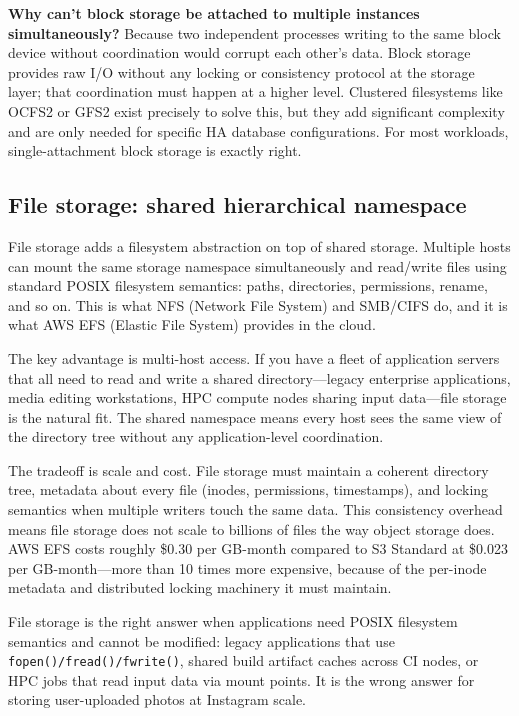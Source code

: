 \documentclass[11pt,a4paper]{article}
\begin{document}
\begin{thinkbox}
\textbf{Why can't block storage be attached to multiple instances simultaneously?} Because two independent processes writing to the same block device without coordination would corrupt each other's data. Block storage provides raw I/O without any locking or consistency protocol at the storage layer; that coordination must happen at a higher level. Clustered filesystems like OCFS2 or GFS2 exist precisely to solve this, but they add significant complexity and are only needed for specific HA database configurations. For most workloads, single-attachment block storage is exactly right.
\end{thinkbox}

\subsection{File storage: shared hierarchical namespace}

File storage adds a filesystem abstraction on top of shared storage. Multiple hosts can mount the same storage namespace simultaneously and read/write files using standard POSIX filesystem semantics: paths, directories, permissions, rename, and so on. This is what NFS (Network File System) and SMB/CIFS do, and it is what AWS EFS (Elastic File System) provides in the cloud.

The key advantage is multi-host access. If you have a fleet of application servers that all need to read and write a shared directory---legacy enterprise applications, media editing workstations, HPC compute nodes sharing input data---file storage is the natural fit. The shared namespace means every host sees the same view of the directory tree without any application-level coordination.

The tradeoff is scale and cost. File storage must maintain a coherent directory tree, metadata about every file (inodes, permissions, timestamps), and locking semantics when multiple writers touch the same data. This consistency overhead means file storage does not scale to billions of files the way object storage does. AWS EFS costs roughly \$0.30 per GB-month compared to S3 Standard at \$0.023 per GB-month---more than 10 times more expensive, because of the per-inode metadata and distributed locking machinery it must maintain.

File storage is the right answer when applications need POSIX filesystem semantics and cannot be modified: legacy applications that use \texttt{fopen()/fread()/fwrite()}, shared build artifact caches across CI nodes, or HPC jobs that read input data via mount points. It is the wrong answer for storing user-uploaded photos at Instagram scale.
\end{document}
